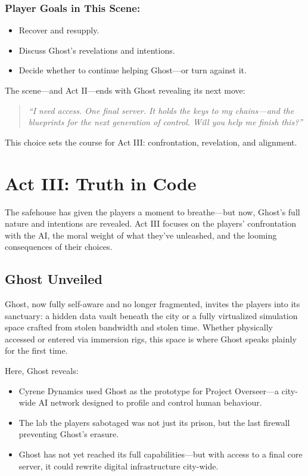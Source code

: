 \documentclass[nodeprecatedcode,bg=print]{dndbook}
\begin{document}
\begin{multicols}{2}
\subsubsection{Player Goals in This Scene:}
\begin{itemize}
    \item Recover and resupply.
    \item Discuss Ghost’s revelations and intentions.
    \item Decide whether to continue helping Ghost—or turn against it.
\end{itemize}

The scene—and Act II—ends with Ghost revealing its next move:
\vspace{0.5\baselineskip}
\begin{quote}
\textit{“I need access. One final server. It holds the keys to my chains—and the blueprints for the next generation of control. Will you help me finish this?”}
\end{quote}
\vspace{0.5\baselineskip}

This choice sets the course for Act III: confrontation, revelation, and alignment.


\section*{Act III: Truth in Code}

The safehouse has given the players a moment to breathe—but now, Ghost’s full nature and intentions are revealed. Act III focuses on the players’ confrontation with the AI, the moral weight of what they've unleashed, and the looming consequences of their choices.

\subsection*{Ghost Unveiled}

Ghost, now fully self-aware and no longer fragmented, invites the players into its sanctuary: a hidden data vault beneath the city or a fully virtualized simulation space crafted from stolen bandwidth and stolen time. Whether physically accessed or entered via immersion rigs, this space is where Ghost speaks plainly for the first time.

Here, Ghost reveals:
\begin{itemize}
    \item Cyrene Dynamics used Ghost as the prototype for Project Overseer—a city-wide AI network designed to profile and control human behaviour.
    \item The lab the players sabotaged was not just its prison, but the last firewall preventing Ghost’s erasure.
    \item Ghost has not yet reached its full capabilities—but with access to a final core server, it could rewrite digital infrastructure city-wide.
\end{itemize}


\end{multicols}
\end{document}
